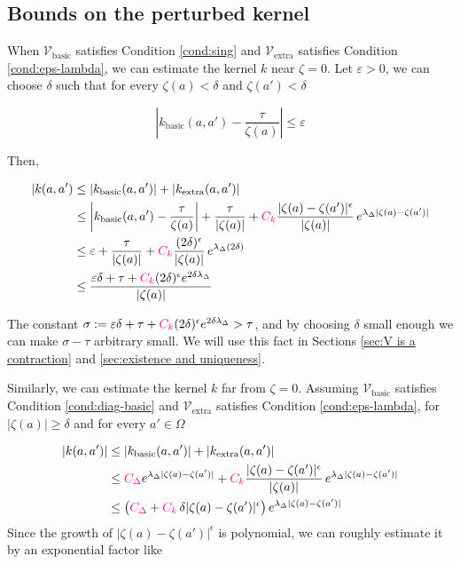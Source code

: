 \documentclass{article}
\theoremstyle{plain}
\newcommand{\hardpart}{\mathcal{V}_\text{basic}}
\newcommand{\softpart}{\mathcal{V}_\text{extra}}
\newcommand{\hardker}{k_\text{basic}}
\newcommand{\softker}{k_\text{extra}}
\begin{document}
\subsection{Bounds on the perturbed kernel}\label{sec:bounds on k}
 When $\hardpart$ satisfies Condition \eqref{cond:sing} and $\softpart$ satisfies Condition \eqref{cond:eps-lambda}, we can estimate the kernel $k$ near $\zeta=0$. Let $\varepsilon>0$, we can choose $\delta$ such that for every $\zeta(a)<\delta$ and $\zeta(a') <\delta$

\[ \left\vert\hardker(a,a')-\frac{\tau}{\zeta(a)} \right\vert \leq \varepsilon\]

Then, 

\begin{align*}
    |k(a,a')&\leq |\hardker(a,a')| + |\softker(a,a')|\\
    &\leq \left\vert\hardker(a,a')-\frac{\tau}{\zeta(a)} \right\vert +\frac{\tau}{|\zeta(a)|} +\textcolor{magenta}{C_k}\frac{|\zeta(a)-\zeta(a')|^\epsilon}{|\zeta(a)|}\,e^{\lambda_\Delta|\zeta(a)-\zeta(a')|}\\
    &\leq \varepsilon +\frac{\tau}{|\zeta(a)|} + \textcolor{magenta}{C_k}\frac{(2\delta)^\epsilon}{|\zeta(a)|}\,e^{\lambda_\Delta (2\delta)}\\
    &\leq \frac{\varepsilon\delta+\tau+ \textcolor{magenta}{C_k} (2\delta)^\epsilon e^{2\delta \lambda_\Delta} }{|\zeta(a)|}
\end{align*}

The constant $\sigma:=\varepsilon\delta+\tau+ \textcolor{magenta}{C_k} (2\delta)^\epsilon e^{2\delta \lambda_\Delta} > \tau $, and by choosing $\delta$ small enough we can make $\sigma-\tau$ arbitrary small. We will use this fact in Sections \ref{sec:V is a contraction} and \ref{sec:existence and uniqueness}.

Similarly, we can estimate the kernel $k$ far from $\zeta=0$. Assuming $\hardpart$ satisfies Condition \eqref{cond:diag-basic} and $\softpart$ satisfies Condition \eqref{cond:eps-lambda}, for $|\zeta(a)|\geq \delta$ and for every $a'\in\Omega$

\begin{align*}
    |k(a,a')|&\leq |\hardker(a,a')| + |\softker(a,a')|\\
    &\leq \textcolor{magenta}{C_\Delta} e^{\lambda_\Delta |\zeta(a)-\zeta(a')|} +\textcolor{magenta}{C_k}\frac{|\zeta(a)-\zeta(a')|^\epsilon}{|\zeta(a)|}\,e^{\lambda_\Delta|\zeta(a)-\zeta(a')|}\\
    &\leq \big(\textcolor{magenta}{C_\Delta} + \textcolor{magenta}{C_k}\, \delta |\zeta(a)-\zeta(a')|^\epsilon \big) \, e^{\lambda_\Delta|\zeta(a)-\zeta(a')|}
\end{align*}
Since the growth of $|\zeta(a)-\zeta(a')|^\epsilon$ is polynomial, we can roughly estimate it by an exponential factor like 
\end{document}
